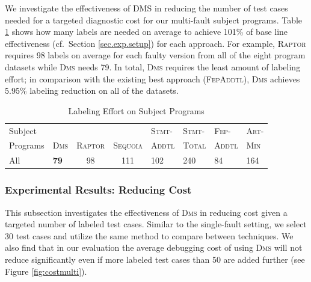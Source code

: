 We investigate the effectiveness of \textsc{DMS} in reducing the number of test cases needed for a targeted diagnostic cost for our multi-fault subject programs. Table \ref{tab:label_effort2} shows how many labels are needed on average to achieve 101\% of base line effectiveness (cf.\ Section \ref{sec.exp.setup}) for each approach. For example, \textsc{Raptor} requires 98 labels on average for each faulty version from all of the eight program datasets while \textsc{Dms} needs 79. In total, \textsc{Dms} requires the least amount of labeling effort; in comparison with the existing best approach (\textsc{FepAddtl}), \textsc{Dms} achieves 5.95\% labeling reduction on all of the datasets.

\begin{table}[!htbp]
	\centering
	\caption{Labeling Effort on Subject Programs}
{
	\scriptsize
		\renewcommand{\arraystretch}{1.5}
		\hspace{-10pt}
        \begin{tabular}{|m{29pt}|m{13pt}|c|c|m{21pt}|m{21pt}|m{21pt}|m{17pt}|}
		   \hline
		     Subject &             &                &           & \textsc{Stmt-} & \textsc{Stmt-} & \textsc{Fep-}  & \textsc{Art-} \\
		   Programs & \textsc{Dms} & \textsc{Raptor}  & \textsc{Sequoia} & \textsc{Addtl} & \textsc{Total} & \textsc{Addtl} & \textsc{Min} \\
		   \hline\hline
		   All &   {\bf 79} &         98 &      111 &       102 &     240 &         84 &      164 \\
		   \hline
		\end{tabular}
}
	\label{tab:label_effort2}
\end{table}


\subsubsection{Experimental Results: Reducing Cost}\label{sec.exp.resultsB2}

This subsection investigates the effectiveness of \textsc{Dms} in reducing cost given a targeted number of labeled test cases. Similar to the single-fault setting, we select 30 test cases and utilize the same method to compare between techniques. We also find that in our evaluation the average debugging cost of using \textsc{Dms} will not reduce significantly even if more labeled test cases than 50 are added further (see Figure \ref{fig:costmulti}).


